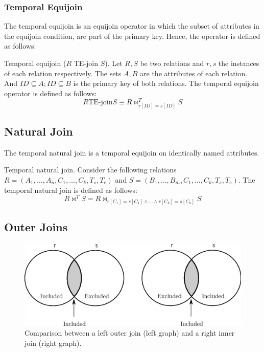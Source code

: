 \documentclass{llncs}
\renewcommand{\Join}{\bowtie}
\begin{document}
\subsubsection{\label{subsubsec:temporal-equijoin}Temporal Equijoin}
The temporal equijoin is an equijoin operator in which the subset of attributes in the equijoin condition, are part of the primary key. Hence, the operator is defined as follows:

\begin{definition}
\label{def:temporal-equijoin}
Temporal equijoin ($R$ TE-join $S$). Let $R, S$ be two relations and $r, s$ the instances of each relation respectively. The sets $A, B$ are the attributes of each relation. And $ID \subseteq A; ID \subseteq B$ is the primary key of both relations. The temporal equijoin operator is defined as follows:
\begin{equation}
 \label{eq:temporal-equijoin} 
R \mbox{TE-join} S \equiv R \Join_{r\left[ID\right] = s\left[ID\right]}^{T} S
\end{equation}
\end{definition}

\subsection{\label{subsec:natural-join}Natural Join}
The temporal natural join is a temporal equijoin on identically named attributes.

\begin{definition}
 \label{def:temporal-natural-join}
Temporal natural join. Consider the following relations $R = \left(A_1, \ldots, A_n, C_1, \ldots, C_k, T_s, T_e \right)$ and $S = \left(B_1, \ldots, B_m, C_1, \ldots, C_k, T_s, T_e \right)$. The temporal natural join is defined as follows:
\begin{equation}
 \label{eq:temporal-natural-join}
R \Join^T S = R \Join_{r\left[C_1\right] = s\left[C_1\right] \wedge \ldots \wedge r\left[C_k\right] = s\left[C_k\right]} S
\end{equation}
\end{definition}

\subsection{\label{subsec:outer-joins}Outer Joins}


\begin{figure}
 \includegraphics[scale=0.60]{graphs/outerjoin.eps}
\caption{\label{fi:outerjoin} Comparison between a left outer join (left graph) and a right inner join (right graph).}
\end{figure}
\end{document}

